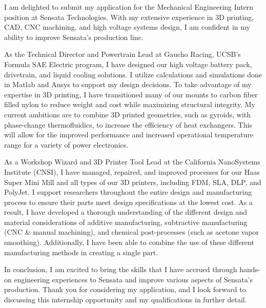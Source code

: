 \documentclass[11pt, letterpaper]{awesome-cv} %
\begin{document}
\makecvheader %

\makelettertitle %


\begin{cvletter}


I am delighted to submit my application for the Mechanical Engineering Intern position at Sensata Technologies. With my extensive experience in 3D printing, CAD, CNC machining, and high voltage systems design, I am confident in my ability to improve Sensata's production line.

As the Technical Director and Powertrain Lead at Gaucho Racing, UCSB's Formula SAE Electric program, I have designed our high voltage battery pack, drivetrain, and liquid cooling solutions. I utilize calculations and simulations done in Matlab and Ansys to support my design decisions. To take advantage of my expertise in 3D printing, I have transitioned many of our mounts to carbon fiber filled nylon to reduce weight and cost while maximizing structural integrity. My current ambitions are to combine 3D printed geometries, such as gyroids, with phase-change thermofluidics, to increase the efficiency of heat exchangers. This will allow for the improved performance and increased operational temperature range for a variety of power electronics.

As a Workshop Wizard and 3D Printer Tool Lead at the California NanoSystems Institute (CNSI), I have managed, repaired, and improved processes for our Haas Super Mini Mill and all types of our 3D printers, including FDM, SLA, DLP, and PolyJet. I support researchers throughout the entire design and manufacturing process to ensure their parts meet design specifications at the lowest cost. As a result, I have developed a thorough understanding of the different design and material considerations of additive manufacturing, subtractive manufacturing (CNC \& manual machining), and chemical post-processes (such as acetone vapor smoothing). Additionally, I have been able to combine the use of these different manufacturing methods in creating a single part.

In conclusion, I am excited to bring the skills that I have accrued through hands-on engineering experiences to Sensata and improve various aspects of Sensata's production. Thank you for considering my application, and I look forward to discussing this internship opportunity and my qualifications in further detail.


\end{cvletter}


\makeletterclosing %
\end{document}

